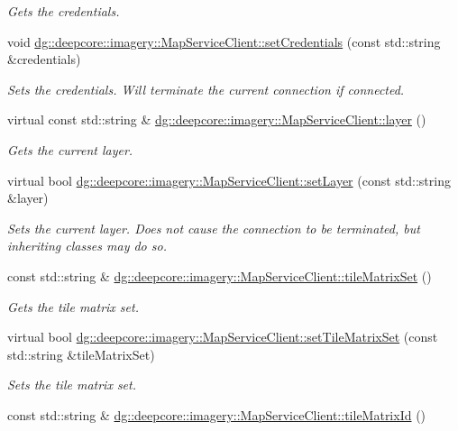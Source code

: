 \begin{DoxyCompactItemize}
\begin{DoxyCompactList}\small\item\em Gets the credentials. \end{DoxyCompactList}\item 
void \hyperlink{group___imagery_module_ga28ed4b8b833fa7785b0c456f79df0c40}{dg\+::deepcore\+::imagery\+::\+Map\+Service\+Client\+::set\+Credentials} (const std\+::string \&credentials)
\begin{DoxyCompactList}\small\item\em Sets the credentials. Will terminate the current connection if connected. \end{DoxyCompactList}\item 
virtual const std\+::string \& \hyperlink{group___imagery_module_gafe3e2d18fb0c9ef72b3c23e97ead241f}{dg\+::deepcore\+::imagery\+::\+Map\+Service\+Client\+::layer} ()
\begin{DoxyCompactList}\small\item\em Gets the current layer. \end{DoxyCompactList}\item 
virtual bool \hyperlink{group___imagery_module_ga509f0f787565fafc1618cc0e5fb2399a}{dg\+::deepcore\+::imagery\+::\+Map\+Service\+Client\+::set\+Layer} (const std\+::string \&layer)
\begin{DoxyCompactList}\small\item\em Sets the current layer. Does not cause the connection to be terminated, but inheriting classes may do so. \end{DoxyCompactList}\item 
const std\+::string \& \hyperlink{group___imagery_module_gae380a970bc0aa63d34e6f2295ea9c8f4}{dg\+::deepcore\+::imagery\+::\+Map\+Service\+Client\+::tile\+Matrix\+Set} ()
\begin{DoxyCompactList}\small\item\em Gets the tile matrix set. \end{DoxyCompactList}\item 
virtual bool \hyperlink{group___imagery_module_ga56c3ba986ce399f2fc6a1d9dcf886b49}{dg\+::deepcore\+::imagery\+::\+Map\+Service\+Client\+::set\+Tile\+Matrix\+Set} (const std\+::string \&tile\+Matrix\+Set)
\begin{DoxyCompactList}\small\item\em Sets the tile matrix set. \end{DoxyCompactList}\item 
const std\+::string \& \hyperlink{group___imagery_module_gae6a1721e1da9ab60ab4e62240baf304b}{dg\+::deepcore\+::imagery\+::\+Map\+Service\+Client\+::tile\+Matrix\+Id} ()

\end{DoxyCompactItemize}
